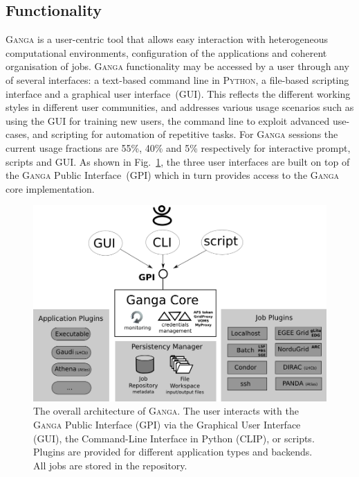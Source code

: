 \documentclass{elsart}
\def\ganga {\textsc{Ganga}\xspace}
\def\python {\textsc{Python}\xspace}
\def\GPI{GPI\xspace}
\begin{document}
\begin{linenumbers}
\section{Functionality}
\label{sec:functionality}
\ganga is a user-centric tool that allows easy interaction with heterogeneous
computational environments, configuration of the applications and coherent
organisation of jobs. \ganga functionality may be accessed by a user through
any of several interfaces: a text-based command line in \python, a file-based
scripting interface and a graphical user interface~(GUI). This reflects the different
working styles in different user communities, and addresses various usage
scenarios such as using the GUI for training new users, the command line to
exploit advanced use-cases, and scripting for automation of repetitive tasks.
For \ganga sessions the current usage fractions are 55\%, 40\% and 5\%
respectively for interactive prompt, scripts and GUI. As shown in
Fig.~\ref{fig:GPI_architecture}, the three user interfaces are built on top of
the \ganga Public Interface~(\GPI) which in turn provides access to the \ganga
core implementation.
\begin{figure}[htbp]
  \centering
  \includegraphics[width=14cm]{ganga-architecture}
  \caption{The overall architecture of \ganga. The user interacts with the
    \ganga Public Interface (GPI) via the Graphical User Interface (GUI), the
    Command-Line Interface in Python (CLIP), or
    scripts. Plugins are provided for different application types and
    backends. All jobs are stored in the
    repository.}
  \label{fig:GPI_architecture}
\end{figure}


\end{linenumbers}
\end{document}
